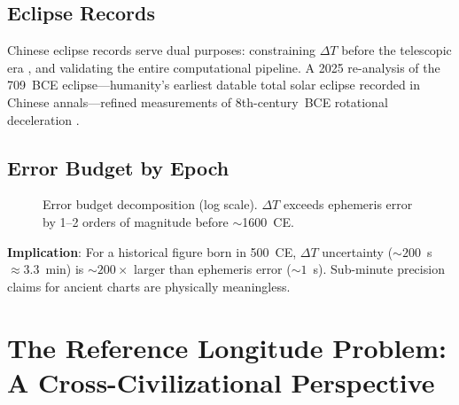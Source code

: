 \documentclass[10pt,a4paper]{article}
\begin{document}
\subsection{Eclipse Records}

Chinese eclipse records serve dual purposes: constraining $\Delta T$ before
the telescopic era \cite{stephenson2018}, and validating the entire
computational pipeline. A 2025 re-analysis of the 709~BCE eclipse---humanity's
earliest datable total solar eclipse recorded in Chinese annals---refined
measurements of 8th-century~BCE rotational deceleration
\cite{eclipse709bce_2025}.

\subsection{Error Budget by Epoch}

\begin{figure}[H]
\centering
{}
\caption{Error budget decomposition (log scale). $\Delta T$ exceeds ephemeris
error by 1--2 orders of magnitude before $\sim$1600~CE.}
\label{fig:error_budget}
\end{figure}

\textbf{Implication}: For a historical figure born in 500~CE, $\Delta T$
uncertainty ($\sim 200$~s $\approx 3.3$~min) is $\sim 200\times$ larger than
ephemeris error ($\sim 1$~s). Sub-minute precision claims for ancient charts
are physically meaningless.

\section{The Reference Longitude Problem: A Cross-Civilizational Perspective}
\label{sec:meridians}
\end{document}
